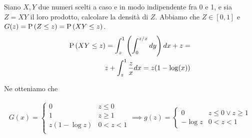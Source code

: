 \begin{exrc}
    Siano $X,Y$ due numeri scelti a caso e in modo indipendente fra 0 e 1, e sia
    $Z = XY$ il loro prodotto, calcolare la densità di $Z$. Abbiamo che $Z \in
    [0, 1]$ e $G(z) = \text{P}\left(Z \leq z\right) = \text{P}\left(XY \leq z\right)$.
    \begin{equation*}
        \begin{aligned}
            \text{P}\left(XY \leq z\right) = \int_{z}^{1} \left( \int_{0}^{z/x} dy \right) dx + z = \\
            z + \int_{z}^{1} \frac{z}{x} dx = z(1-\log(x))
        \end{aligned}
    \end{equation*}

    Ne otteniamo che

    \begin{equation*}
        \begin{aligned}
            G(x) = \begin{cases}
                0 & z \leq 0 \\
                1 & z \geq 1 \\
                z(1 - \log{z}) & 0 < z < 1 \\
            \end{cases} \implies
            g(z) = \begin{cases}
                0 & z \leq 0 \lor z \geq 1 \\
                - \log{z} & 0 < z < 1
            \end{cases}
        \end{aligned}
    \end{equation*}
\end{exrc}


